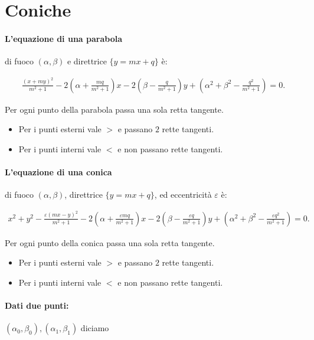 \documentclass{article}
\begin{document}
\newpage
\section*{Coniche}

\paragraph{L'equazione di una parabola} di fuoco $(\alpha, \beta)$ e direttrice $\{y = m x + q\}$ è:

\begin{align*}
\frac{(x + m y)^2}{m^2 + 1} - 2 \left(\alpha + \frac{m q}{m^2 + 1}\right) x - 2 \left(\beta - \frac{q}{m^2 + 1}\right) y + \left(\alpha^2 + \beta^2 - \frac{q^2}{m^2 + 1}\right) = 0.
\end{align*}

Per ogni punto della parabola passa una sola retta tangente.

\begin{itemize}
\item Per i punti esterni vale $>$ e passano $2$ rette tangenti.
\item Per i punti interni vale $<$ e non passano rette tangenti.
\end{itemize}

\paragraph{L'equazione di una conica} di fuoco $(\alpha, \beta)$, direttrice $\{y = m x + q\}$, ed eccentricità $\varepsilon$ è:

\begin{align*}
x^2 + y^2 - \frac{\varepsilon (m x - y)^2}{m^2 + 1} - 2 \left(\alpha + \frac{\varepsilon m q}{m^2 + 1}\right) x - 2 \left(\beta - \frac{\varepsilon q}{m^2 + 1}\right) y + \left(\alpha^2 + \beta^2 - \frac{\varepsilon q^2}{m^2 + 1}\right) = 0.
\end{align*}

Per ogni punto della conica passa una sola retta tangente.

\begin{itemize}
\item Per i punti esterni vale $>$ e passano $2$ rette tangenti.
\item Per i punti interni vale $<$ e non passano rette tangenti.
\end{itemize}

\paragraph{Dati due punti:} $(\alpha_0, \beta_0), (\alpha_1, \beta_1)$ diciamo
\end{document}
